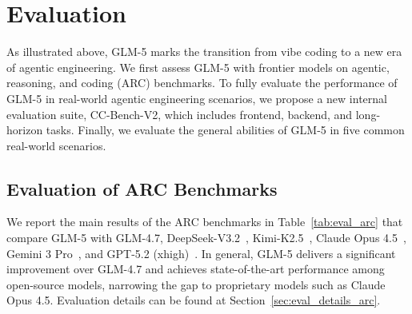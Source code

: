 

\section{Evaluation}
\label{sec:evaluation}


As illustrated above, GLM-5 marks the transition from vibe coding to a new era of agentic engineering. 
We first assess GLM-5 with frontier models on agentic, reasoning, and coding (ARC) benchmarks. 
To fully evaluate the performance of GLM-5 in real-world agentic engineering scenarios, we propose a new internal evaluation suite, CC-Bench-V2, which includes frontend, backend, and long-horizon tasks. 
Finally, we evaluate the general abilities of GLM-5 in five common real-world scenarios. 


\subsection{Evaluation of ARC Benchmarks}

We report the main results of the ARC benchmarks in Table~\ref{tab:eval_arc} that compare GLM-5 with GLM-4.7, DeepSeek-V3.2~\cite{liu2025deepseek}, Kimi-K2.5~\cite{team2026kimi}, Claude Opus 4.5~\cite{opus4.5}, Gemini 3 Pro~\cite{gemini3}, and GPT-5.2 (xhigh)~\cite{gpt-5.2}. 
In general, GLM-5 delivers a significant improvement over GLM-4.7 and achieves state-of-the-art performance among open-source models, narrowing the gap to proprietary models such as Claude Opus 4.5. Evaluation details can be found at Section~\ref{sec:eval_details_arc}.

